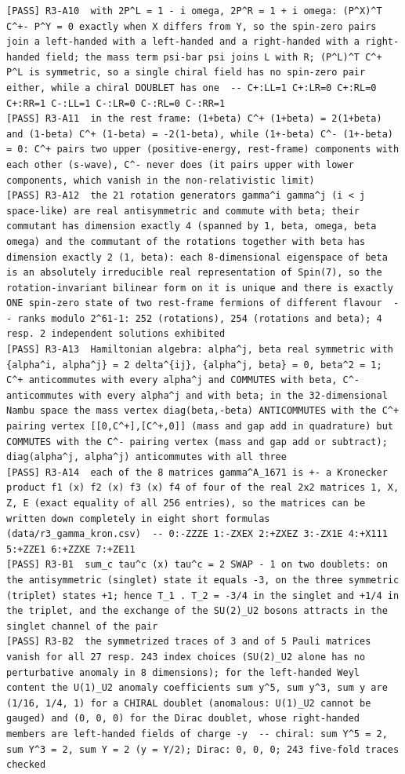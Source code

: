 \documentclass[
  10pt,
]{article}
\begin{document}
\begin{verbatim}
[PASS] R3-A10  with 2P^L = 1 - i omega, 2P^R = 1 + i omega: (P^X)^T C^+- P^Y = 0 exactly when X differs from Y, so the spin-zero pairs join a left-handed with a left-handed and a right-handed with a right-handed field; the mass term psi-bar psi joins L with R; (P^L)^T C^+ P^L is symmetric, so a single chiral field has no spin-zero pair either, while a chiral DOUBLET has one  -- C+:LL=1 C+:LR=0 C+:RL=0 C+:RR=1 C-:LL=1 C-:LR=0 C-:RL=0 C-:RR=1
[PASS] R3-A11  in the rest frame: (1+beta) C^+ (1+beta) = 2(1+beta) and (1-beta) C^+ (1-beta) = -2(1-beta), while (1+-beta) C^- (1+-beta) = 0: C^+ pairs two upper (positive-energy, rest-frame) components with each other (s-wave), C^- never does (it pairs upper with lower components, which vanish in the non-relativistic limit)
[PASS] R3-A12  the 21 rotation generators gamma^i gamma^j (i < j space-like) are real antisymmetric and commute with beta; their commutant has dimension exactly 4 (spanned by 1, beta, omega, beta omega) and the commutant of the rotations together with beta has dimension exactly 2 (1, beta): each 8-dimensional eigenspace of beta is an absolutely irreducible real representation of Spin(7), so the rotation-invariant bilinear form on it is unique and there is exactly ONE spin-zero state of two rest-frame fermions of different flavour  -- ranks modulo 2^61-1: 252 (rotations), 254 (rotations and beta); 4 resp. 2 independent solutions exhibited
[PASS] R3-A13  Hamiltonian algebra: alpha^j, beta real symmetric with {alpha^i, alpha^j} = 2 delta^{ij}, {alpha^j, beta} = 0, beta^2 = 1; C^+ anticommutes with every alpha^j and COMMUTES with beta, C^- anticommutes with every alpha^j and with beta; in the 32-dimensional Nambu space the mass vertex diag(beta,-beta) ANTICOMMUTES with the C^+ pairing vertex [[0,C^+],[C^+,0]] (mass and gap add in quadrature) but COMMUTES with the C^- pairing vertex (mass and gap add or subtract); diag(alpha^j, alpha^j) anticommutes with all three
[PASS] R3-A14  each of the 8 matrices gamma^A_1671 is +- a Kronecker product f1 (x) f2 (x) f3 (x) f4 of four of the real 2x2 matrices 1, X, Z, E (exact equality of all 256 entries), so the matrices can be written down completely in eight short formulas (data/r3_gamma_kron.csv)  -- 0:-ZZZE 1:-ZXEX 2:+ZXEZ 3:-ZX1E 4:+X111 5:+ZZE1 6:+ZZXE 7:+ZE11
[PASS] R3-B1  sum_c tau^c (x) tau^c = 2 SWAP - 1 on two doublets: on the antisymmetric (singlet) state it equals -3, on the three symmetric (triplet) states +1; hence T_1 . T_2 = -3/4 in the singlet and +1/4 in the triplet, and the exchange of the SU(2)_U2 bosons attracts in the singlet channel of the pair
[PASS] R3-B2  the symmetrized traces of 3 and of 5 Pauli matrices vanish for all 27 resp. 243 index choices (SU(2)_U2 alone has no perturbative anomaly in 8 dimensions); for the left-handed Weyl content the U(1)_U2 anomaly coefficients sum y^5, sum y^3, sum y are (1/16, 1/4, 1) for a CHIRAL doublet (anomalous: U(1)_U2 cannot be gauged) and (0, 0, 0) for the Dirac doublet, whose right-handed members are left-handed fields of charge -y  -- chiral: sum Y^5 = 2, sum Y^3 = 2, sum Y = 2 (y = Y/2); Dirac: 0, 0, 0; 243 five-fold traces checked
\end{verbatim}
\end{document}
